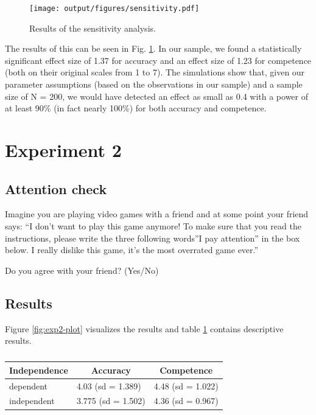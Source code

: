 \documentclass[
  doc,floatsintext]{apa6}
\begin{document}
\begin{figure}
\centering
\texttt{[image: output/figures/sensitivity.pdf]}
\caption{\label{fig:sensitivity}Results of the sensitivity analysis.}
\end{figure}

The results of this can be seen in Fig. \ref{fig:sensitivity}. In our sample, we found a statistically significant effect size of 1.37 for accuracy and an effect size of 1.23 for competence (both on their original scales from 1 to 7). The simulations show that, given our parameter assumptions (based on the observations in our sample) and a sample size of N = 200, we would have detected an effect as small as 0.4 with a power of at least 90\% (in fact nearly 100\%) for both accuracy and competence.

\clearpage

\section{Experiment 2}\label{exp2}

\FloatBarrier

\subsection{Attention check}\label{attention-check-1}

Imagine you are playing video games with a friend and at some point your friend says: ``I don't want to play this game anymore! To make sure that you read the instructions, please write the three following words''I pay attention'' in the box below. I really dislike this game, it's the most overrated game ever.''

Do you agree with your friend? (Yes/No)

\subsection{Results}\label{results-1}

Figure \ref{fig:exp2-plot} visualizes the results and table \ref{tab:exp2-table} contains descriptive results.

\begin{table}[tbp]

\begin{center}
\begin{threeparttable}

\caption{\label{tab:exp2-table}}

\begin{tabular}{lll}
\toprule
Independence & \multicolumn{1}{c}{Accuracy} & \multicolumn{1}{c}{Competence}\\
\midrule
dependent & 4.03 (sd = 1.389) & 4.48 (sd = 1.022)\\
independent & 3.775 (sd = 1.502) & 4.36 (sd = 0.967)\\
\bottomrule
\end{tabular}

\end{threeparttable}
\end{center}

\end{table}
\end{document}

